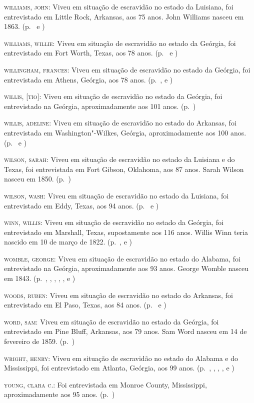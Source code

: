 \begin{Parskip}
\textsc{williams, john:} Viveu em situação de escravidão no estado da Luisiana, foi entrevistado
em Little Rock, Arkansas, aos 75 anos. John Williams nasceu em 1863. (p.~\pageref{ref291} e \pageref{ref292})

\textsc{williams, willie:} Viveu em situação de escravidão no estado da Geórgia, foi
entrevistado em Fort Worth, Texas, aos 78 anos. (p.~\pageref{ref293} e \pageref{ref294})

\textsc{willingham, frances:} Viveu em situação de escravidão no estado da Geórgia, foi
entrevistada em Athens, Geórgia, aos 78 anos. (p.~\pageref{ref295}, \pageref{ref296} e \pageref{ref297})

\textsc{willis, {[}tio{]}:} Viveu em situação de escravidão no estado da Geórgia, foi entrevistado na
Geórgia, aproximadamente aos 101 anos. (p.~\pageref{ref323})

\textsc{willis, adeline:} Viveu em situação de escravidão no estado do Arkansas, foi
entrevistada em Washington"-Wilkes, Geórgia, aproximadamente aos 100
anos. (p.~\pageref{ref298} e \pageref{ref299})

\textsc{wilson, sarah:} Viveu em situação de escravidão no estado da Luisiana e do Texas, foi
entrevistada em Fort Gibson, Oklahoma, aos 87 anos. Sarah Wilson nasceu
em 1850. (p.~\pageref{ref300})

\textsc{wilson, wash:} Viveu em situação de escravidão no estado da Luisiana, foi entrevistado em
Eddy, Texas, aos 94 anos. (p.~\pageref{ref301} e \pageref{ref302})

\textsc{winn, willis:} Viveu em situação de escravidão no estado da Geórgia, foi entrevistado em
Marshall, Texas, supostamente aos 116 anos. Willis Winn teria nascido em
10 de março de 1822. (p.~\pageref{ref303}, \pageref{ref304} e \pageref{ref305})

\textsc{womble, george:} Viveu em situação de escravidão no estado do Alabama, foi entrevistado
na Geórgia, aproximadamente aos 93 anos. George Womble nasceu em 1843. (p.~\pageref{ref306}, \pageref{ref307}, \pageref{ref308}, \pageref{ref309}, \pageref{ref310}, \pageref{ref311} e \pageref{ref312})

\textsc{woods, ruben:} Viveu em situação de escravidão no estado do Arkansas, foi entrevistado
em El Paso, Texas, aos 84 anos. (p.~\pageref{ref313} e \pageref{ref314}) 

\textsc{word, sam:} Viveu em situação de escravidão no estado da Geórgia, foi entrevistado em
Pine Bluff, Arkansas, aos 79 anos. Sam Word nasceu em 14 de fevereiro de 1859. (p.~\pageref{ref315})

\textsc{wright, henry:} Viveu em situação de escravidão no estado do Alabama e do Mississippi,
foi entrevistado em Atlanta, Geórgia, aos 99 anos. (p.~\pageref{ref316}, \pageref{ref317}, \pageref{ref318}, \pageref{ref319}, \pageref{ref320} e \pageref{ref321})

\textsc{young, clara c.:} Foi entrevistada em Monroe County,
Mississippi, aproximadamente aos 95 anos. (p.~\pageref{ref322})
\end{Parskip}


